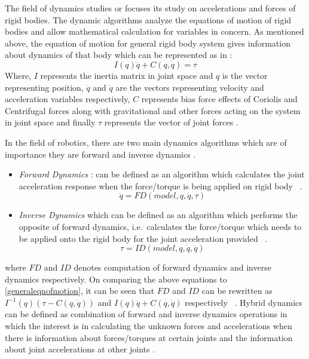 The field of dynamics studies or focuses its study on accelerations and forces of rigid bodies. The dynamic algorithms analyze the equations of motion of rigid bodies and allow mathematical calculation for variables in concern. As mentioned above, the equation of motion for general rigid body system gives information about dynamics of that body which can be represented as in \cite{featherstone2014rigid}:
\begin{equation}
I(q)\ddot{q}+ C(q,\dot{q}) = \tau
\label{generaleqnofmotion}
\end{equation}
Where, $I$ represents the inertia matrix in joint space and $q$ is the vector representing position, $\dot{q}$ and $\ddot{q}$ are the vectors representing velocity and acceleration variables respectively, $C$ represents bias force effects of Coriolis and Centrifugal forces along with gravitational and other forces acting on the system in joint space and finally $\tau$ represents the vector of joint forces \cite{featherstone2014rigid}.
\par
In the field of robotics, there are two main dynamics algorithms which are of importance they are forward and inverse dynamics \cite{featherstone2014rigid}.
\begin{itemize}
	\item  \textit{Forward Dynamics} : can be defined as an algorithm which calculates the joint acceleration response when the force/torque is being applied on rigid body ~\cite{featherstone2014rigid}.
	\begin{equation}
	\ddot{q} = FD(model, q, \dot{q},\tau)
	\end{equation}
	\item  \textit{Inverse Dynamics} which can be defined as an algorithm which performs the opposite of forward dynamics, i.e.\ calculates the force/torque which needs to be applied onto the rigid body for the joint acceleration provided ~\cite{featherstone2014rigid}. 
	\begin{equation}
	\tau =  ID(model,q, \dot{q}, \ddot{q})
	\end{equation}
\end{itemize}
where $FD$ and $ID$ denotes computation of forward dynamics and inverse dynamics respectively. On comparing the above equations to \ref{generaleqnofmotion}, it can be seen that $FD$ and $ID$ can be rewritten as $I^{-1}(q)(\tau - C(q,\dot{q}))$ and $I(q)\ddot{q} + C(q,\dot{q})$ respectively ~\cite{featherstone2014rigid}. Hybrid dynamics can be defined as combination of forward and inverse dynamics operations in which the interest is in calculating the unknown forces and accelerations when there is information about forces/torques at certain joints and the information about joint accelerations at other joints \cite{featherstone2014rigid}. 


